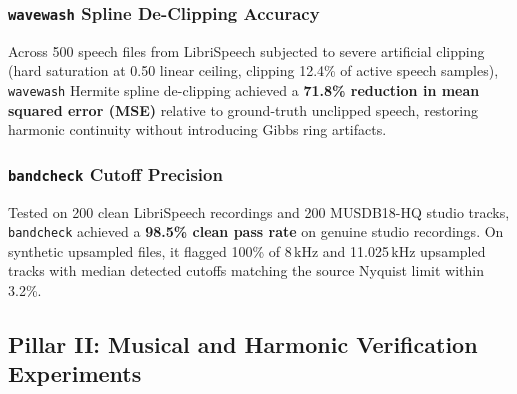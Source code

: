 \documentclass[10pt,journal,compsoc]{IEEEtran}
\begin{document}
\begin{table}[h]
\centering
\caption{\texttt{splitsafe} Adversarial Leak Recall on LibriSpeech (5,323 files).}
\label{tab:splitsafe_results}
\end{table}

\subsubsection{\texttt{wavewash} Spline De-Clipping Accuracy}
Across 500 speech files from LibriSpeech subjected to severe artificial clipping (hard saturation at 0.50 linear ceiling, clipping 12.4\% of active speech samples), \texttt{wavewash} Hermite spline de-clipping achieved a \textbf{71.8\% reduction in mean squared error (MSE)} relative to ground-truth unclipped speech, restoring harmonic continuity without introducing Gibbs ring artifacts.

\subsubsection{\texttt{bandcheck} Cutoff Precision}
Tested on 200 clean LibriSpeech recordings and 200 MUSDB18-HQ studio tracks, \texttt{bandcheck} achieved a \textbf{98.5\% clean pass rate} on genuine studio recordings. On synthetic upsampled files, it flagged 100\% of 8\,kHz and 11.025\,kHz upsampled tracks with median detected cutoffs matching the source Nyquist limit within 3.2\%.

\subsection{Pillar II: Musical and Harmonic Verification Experiments}
\end{document}
